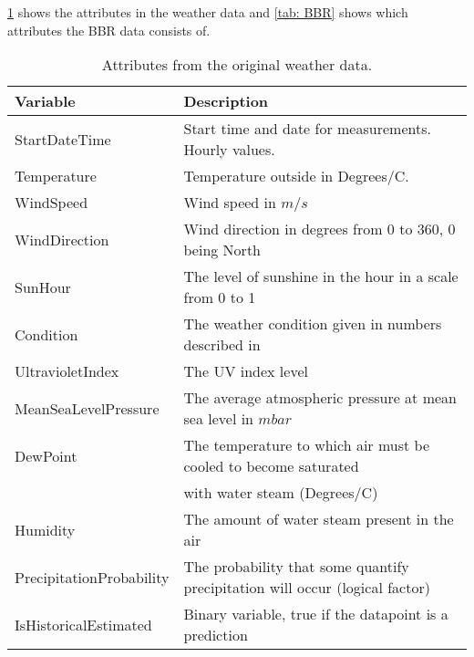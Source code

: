 \noindent \cref{tab: weatherdata} shows the attributes in the weather data and \cref{tab: BBR} shows which attributes the BBR data consists of.
\begin{table}[H]
    \centering
    \begin{tabular}{ll}
     \hline
     \textbf{Variable} & \textbf{Description} \\
    \hline
    \hline
    StartDateTime  &  Start time and date for measurements. Hourly values.\\
    Temperature  &  Temperature outside in Degrees/C. \\
    WindSpeed  & Wind speed in $m/s$\\
    WindDirection  & Wind direction in degrees from 0 to 360, 0 being North \\
    SunHour  & The level of sunshine in the hour in a scale from 0 to 1 \\
    Condition  & The weather condition given in numbers described in \cite{condition} \\
    UltravioletIndex  & The UV index level \\
    MeanSeaLevelPressure  & The average atmospheric pressure at mean sea level in $mbar$ \\
    DewPoint  &  The temperature to which air must be cooled to become saturated \\ & with water steam (Degrees/C)\\
    Humidity  & The amount of water steam present in the air \\
    PrecipitationProbability & The probability that some quantify precipitation will occur (logical factor)\\
    IsHistoricalEstimated & Binary variable, true if the datapoint is a prediction \\
    \hline
    \end{tabular}
    \caption{Attributes from the original weather data.}
    \label{tab: weatherdata}
\end{table}   
